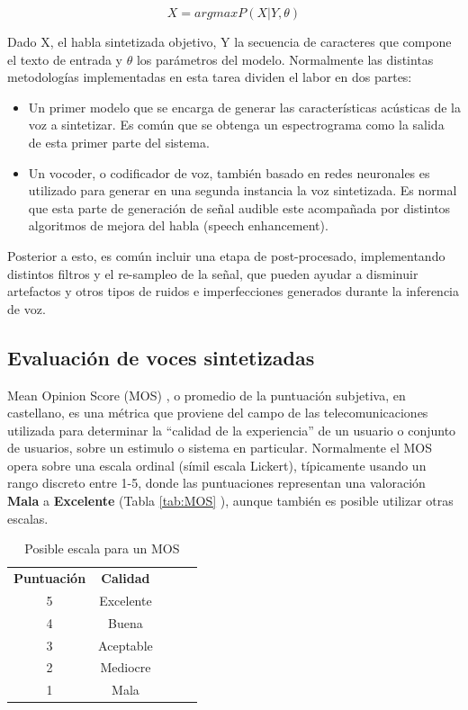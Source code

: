 \begin{equation}
X = argmax P(X | Y, \theta )
\end{equation}

Dado X, el habla sintetizada objetivo, Y la secuencia de caracteres que compone el texto de entrada y \begin{math} \theta \end{math} los parámetros del modelo. Normalmente las distintas metodologías implementadas en esta tarea dividen el labor en dos partes:

\begin{itemize}
    \item Un primer modelo que se encarga de generar las características acústicas de la voz a sintetizar. Es común que se obtenga un espectrograma como la salida de esta primer parte del sistema.
    \item Un vocoder, o codificador de voz, también basado en redes neuronales es utilizado para generar en una segunda instancia la voz sintetizada. Es normal que esta parte de generación de señal audible este acompañada por distintos algoritmos de mejora del habla (speech enhancement).
\end{itemize}

Posterior a esto, es común incluir una etapa de post-procesado, implementando distintos filtros y el re-sampleo de la señal, que pueden ayudar a disminuir artefactos y otros tipos de ruidos e imperfecciones generados durante la inferencia de voz.

\subsection{Evaluación de voces sintetizadas}

Mean Opinion Score (MOS) \cite{itu}, o promedio de la puntuación subjetiva, en castellano, es una métrica que proviene del campo de las telecomunicaciones utilizada para determinar la “calidad de la experiencia'' de un usuario o conjunto de usuarios, sobre un estimulo o sistema en particular. Normalmente el MOS opera sobre una escala ordinal (símil escala Lickert), típicamente usando un rango discreto entre 1-5, donde las puntuaciones representan una valoración \textbf{Mala} a \textbf{Excelente} (Tabla \eqref{tab:MOS} ), aunque también es posible utilizar otras escalas. 

\begin{table}[h]
\centering
\caption{Posible escala para un MOS}
\label{tab:MOS}
\begin{tabular}{cclll}
\textbf{Puntuación} & \textbf{Calidad} &  &  &  \\ \cline{1-2}
5               & Excelente      &  &  &  \\
4               & Buena           &  &  &  \\
3               & Aceptable           &  &  &  \\
2               & Mediocre           &  &  &  \\
1               & Mala            &  &  & 
\end{tabular}
\end{table}

